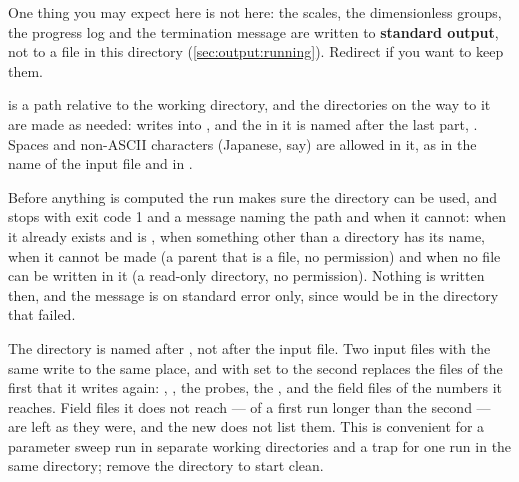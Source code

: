 One thing you may expect here is not here: the scales, the dimensionless
groups, the progress log and the termination message are written to
\textbf{standard output}, not to a file in this directory
(\cref{sec:output:running}). Redirect if you want to keep them.

 is a path relative to the working directory, and the
directories on the way to it are made as needed: 
writes into , and the  in it is named after
the last part, . Spaces and non-ASCII characters (Japanese,
say) are allowed in it, as in the name of the input file and in
.

Before anything is computed the run makes sure the directory can be used, and
stops with exit code 1 and a message naming the path and  when it
cannot: when it already exists and  is , when
something other than a directory has its name, when it cannot be made (a
parent that is a file, no permission) and when no file can be written in it
(a read-only directory, no permission). Nothing is written then, and the
message is on standard error only, since  would be in
the directory that failed.

\begin{note}
  The directory is named after , not after the input file. Two
  input files with the same  write to the same place, and with
   set to  the second replaces the files of
  the first that it writes again: , , the
  probes, the ,  and the field files of the
  numbers it reaches. Field files it does not reach --- 
  of a first run longer than the second --- are left as they were, and the
  new  does not list them. This is convenient for a parameter sweep
  run in separate working directories and a trap for one run in the same
  directory; remove the directory to start clean.
\end{note}

\section{}
\label{sec:output:jobinfo}

